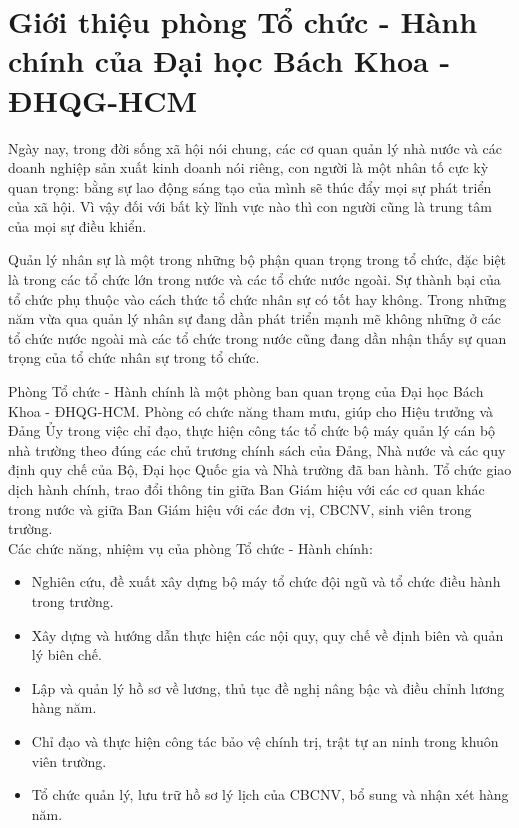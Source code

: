 \section{Giới thiệu phòng Tổ chức - Hành chính của Đại học Bách Khoa - ĐHQG-HCM}
Ngày nay, trong đời sống xã hội nói chung, các cơ quan quản lý nhà nước và các doanh nghiệp sản xuất kinh doanh nói riêng, con người là một nhân tố cực kỳ quan trọng: bằng sự lao động sáng tạo của mình sẽ thúc đẩy mọi sự phát triển của xã hội. Vì vậy đối với bất kỳ lĩnh vực nào thì con người cũng là trung tâm của mọi sự điều khiển.

Quản lý nhân sự là một trong những bộ phận quan trọng trong tổ chức, đặc biệt là trong các tổ chức lớn trong nước và các tổ chức nước ngoài. Sự thành bại của tổ chức phụ thuộc vào cách thức tổ chức nhân sự có tốt hay không. Trong những năm vừa qua quản lý nhân sự đang dần phát triển mạnh mẽ không những ở các tổ chức nước ngoài mà các tổ chức trong nước cũng đang dần nhận thấy sự quan trọng của tổ chức nhân sự trong tổ chức.

Phòng Tổ chức - Hành chính là một phòng ban quan trọng của Đại học Bách Khoa - ĐHQG-HCM. Phòng có chức năng tham mưu, giúp cho Hiệu trưởng và Đảng Ủy trong việc chỉ đạo, thực hiện công tác tổ chức bộ máy quản lý cán bộ nhà trường theo đúng các chủ trương chính sách của Đảng, Nhà nước và các quy định quy chế của Bộ, Đại học Quốc gia và Nhà trường đã ban hành. Tổ chức giao dịch hành chính, trao đổi thông tin giữa Ban Giám hiệu với các cơ quan khác trong nước và giữa Ban Giám hiệu với các đơn vị, CBCNV, sinh viên trong trường.\\

Các chức năng, nhiệm vụ của phòng Tổ chức - Hành chính:
\begin{itemize}
    \item Nghiên cứu, đề xuất xây dựng bộ máy tổ chức đội ngũ và tổ chức điều hành trong trường.
    \item Xây dựng và hướng dẫn thực hiện các nội quy, quy chế về định biên và quản lý biên chế.
    \item Lập và quản lý hồ sơ về lương, thủ tục đề nghị nâng bậc và điều chỉnh lương hàng năm.
    \item Chỉ đạo và thực hiện công tác bảo vệ chính trị, trật tự an ninh trong khuôn viên trường.
    \item Tổ chức quản lý, lưu trữ hồ sơ lý lịch của CBCNV, bổ sung và nhận xét hàng năm.
\end{itemize}


